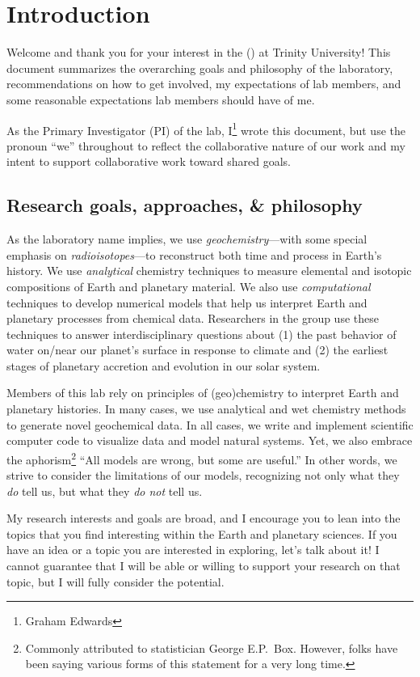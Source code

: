 \section{Introduction}

Welcome and thank you for your interest in the \Grackle{} (\grackle{}) at Trinity University!
This document summarizes the overarching goals and philosophy of the laboratory, recommendations on how to get involved, my expectations of lab members, and some reasonable expectations lab members should have of me.

As the Primary Investigator (PI) of the lab, I\footnote{Graham Edwards} wrote this document, but use the pronoun ``we'' throughout to reflect the collaborative nature of our work and my intent to support collaborative work toward shared goals.

\subsection{Research goals, approaches, \& philosophy}

As the laboratory name implies, we use \emph{geochemistry}---with some special emphasis on \emph{radioisotopes}---to reconstruct both time and process in Earth's history.
We use \emph{analytical} chemistry techniques to measure elemental and isotopic compositions of Earth and planetary material.
We also use \emph{computational} techniques to develop numerical models that help us interpret Earth and planetary processes from chemical data.
Researchers in the group use these techniques to answer interdisciplinary questions about (1) the past behavior of water on/near our planet's surface in response to climate and (2) the earliest stages of planetary accretion and evolution in our solar system.  


Members of this lab rely on principles of (geo)chemistry to interpret Earth and planetary histories.
In many cases, we use analytical and wet chemistry methods to generate novel geochemical data. 
In all cases, we write and implement scientific computer code to visualize data and model natural systems.
Yet, we also embrace the aphorism\footnote{Commonly attributed to statistician George E.P.~Box. However, folks have been saying various forms of this statement for a very long time.} 
``All models are wrong, but some are useful.''
In other words, we strive to consider the limitations of our models, recognizing not only what they \emph{do} tell us, but what they \emph{do not} tell us.

My research interests and goals are broad, and I encourage you to lean into the topics that you find interesting within the Earth and planetary sciences. 
If you have an idea or a topic you are interested in exploring, let's talk about it! 
I cannot guarantee that I will be able or willing to support your research on that topic, but I will fully consider the potential.